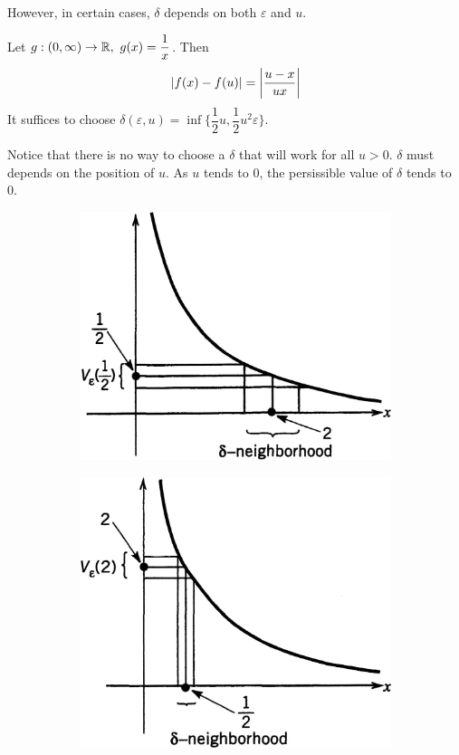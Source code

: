 \documentclass[a4paper,12pt]{article}
\begin{document}
\begin{example}
    However, in certain cases, \(\delta\) depends on both \(\varepsilon\) and \(u\).

    Let \(g:(0,\infty)\rightarrow\R,\ g(x)=\dfrac{1}{x}\). Then 
    \[\left\lvert f(x)-f(u)\right\rvert=\left\lvert \frac{u-x}{ux}\right\rvert\]
    It suffices to choose \(\delta(\varepsilon, u)=\inf\{\dfrac{1}{2}u, \dfrac{1}{2}u^2\varepsilon\}\). 
    
    Notice that there is no way to choose a \(\delta\) that will work for all \(u>0\). \(\delta\) must depends on the position of \(u\). 
    As \(u\) tends to 0, the persissible value of \(\delta\) tends to 0.
    
\end{example}
\begin{figure}[h]
    \centering
    \begin{subfigure}{.45\textwidth}
        \centering
        \includegraphics[width=0.8\linewidth]{image/uniform_1.jpg}
    \end{subfigure}
    \begin{subfigure}{.45\textwidth}
        \centering
        \includegraphics[width=0.8\linewidth]{image/uniform_2.jpg}
    \end{subfigure}
\end{figure}
\end{document}
